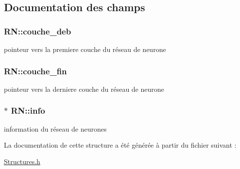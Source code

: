 \subsection{Documentation des champs}
\subsubsection[{\texorpdfstring{couche\+\_\+deb}{couche_deb}}]{ R\+N\+::couche\+\_\+deb}\hypertarget{structRN_a7819ca58c5af68054e17881d5189edb2}{}\label{structRN_a7819ca58c5af68054e17881d5189edb2}
pointeur vers la premiere couche du réseau de neurone 
\subsubsection[{\texorpdfstring{couche\+\_\+fin}{couche_fin}}]{ R\+N\+::couche\+\_\+fin}\hypertarget{structRN_a587292a48a2d40ee63c00b1e0162e9e2}{}\label{structRN_a587292a48a2d40ee63c00b1e0162e9e2}
pointeur vers la derniere couche du réseau de neurone 
\subsubsection[{\texorpdfstring{info}{info}}]{$\ast$ R\+N\+::info}\hypertarget{structRN_a6e638d06aa8ad842d9b7e866f8a0e749}{}\label{structRN_a6e638d06aa8ad842d9b7e866f8a0e749}
information du réseau de neurones 

La documentation de cette structure a été générée à partir du fichier suivant \+:\begin{DoxyCompactItemize}
\item 
\hyperlink{Structures_8h}{Structures.\+h}\end{DoxyCompactItemize}

